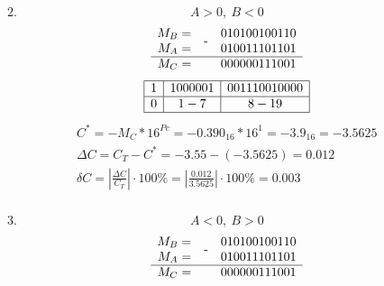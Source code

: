 \documentclass{article}
\begin{document}
\begin{enumerate}
\begin{enumerate}
$$                          $$
                    \item $$ A > 0,\ B < 0 $$
                          $$ 
                                 \begin{array}{rcr}
                                        M_B = & \MINUS & 010100100110         \\
                                        M_A = &        & 010011101101     \nl
                                        M_C = &        & 000000111001         \\
                                 \end{array}
                          $$
                          $$
                                 \begin{array}{|c|c|c|}
                                        \hline
                                        1 & 1000001 & 001110010000 \nl
                                        0 & 1 - 7   & 8 - 19 \nl
                                 \end{array}
                          $$
                          $$
                                 \begin{array}{c}
                                        C^*      = -M_C * 16^{Pc} = -0.390_{16} * 16^1 = -3.9_{16}  = -3.5625                                             \\
                                        \Delta C = C_T - C^* = -3.55 - (-3.5625) = 0.012                                                                  \\
                                        \delta C = \left|\frac{\Delta C}{C_T}\right| \cdot 100\% = \left|\frac{0.012}{3.5625 }\right| \cdot 100\% = 0.003 \\
                                 \end{array}
                          $$
                    \item $$ A < 0,\ B > 0 $$
                          $$ 
                                 \begin{array}{rcr}
                                        M_B = & \MINUS & 010100100110         \\
                                        M_A = &        & 010011101101     \nl
                                        M_C = &        & 000000111001         \\
                                 \end{array}
                          $$
                          $$
                                 \begin{array}{|c|c|c|}

\end{array}$$
\end{enumerate}
\end{enumerate}
\end{document}
